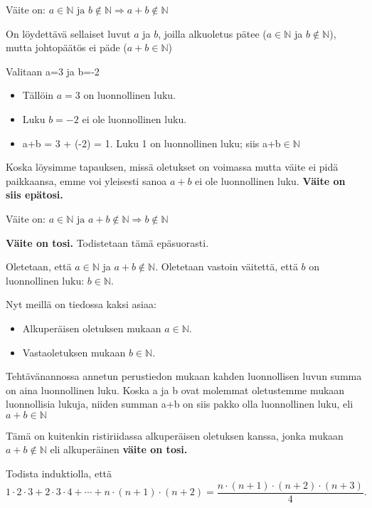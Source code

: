\documentclass[12pt,a4paper]{article}
\newcommand{\N}{\mathbb{N}}
\begin{document}
  \begin{alakohta}
  \item %
    Väite on: $a\in\N \textrm{ ja } b\notin\N \Rightarrow a+b\notin\N$

    On löydettävä sellaiset luvut $a$ ja $b$, joilla alkuoletus pätee
    ($a\in\N$ ja $b\notin\N$), mutta johtopäätös ei päde ($a+b\in\N$)

    Valitaan a=3 ja b=-2
    \begin{itemize}
      \item Tällöin $a=3$ on luonnollinen luku.
      \item Luku $b=-2$ ei ole luonnollinen luku.
      \item a+b = 3 + (-2) = 1. Luku 1 on luonnollinen luku; siis a+b$\in\N$
    \end{itemize}
    Koska löysimme tapauksen, missä oletukset on voimassa mutta väite
    ei pidä paikkaansa, emme voi yleisesti sanoa $a+b$ ei ole
    luonnollinen luku. \textbf{Väite on siis epätosi.} 

  \item %
    Väite on: $a\in\N \textrm{ ja } a+b\notin\N \Rightarrow b\notin\N$

    \textbf{Väite on tosi.} Todistetaan tämä epäsuorasti.

    Oletetaan, että $a\in\N$ ja $a+b\notin\N$. Oletetaan vastoin väitettä,
    että $b$ on luonnollinen luku: $b\in\N$.

    Nyt meillä on tiedossa kaksi asiaa:
    \begin{itemize}
      \item Alkuperäisen oletuksen mukaan $a\in\N$.
      \item Vastaoletuksen mukaan $b\in\N$.
    \end{itemize}
    Tehtävänannossa annetun perustiedon mukaan kahden luonnollisen luvun
    summa on aina luonnollinen luku. Koska a ja b ovat molemmat
    oletustemme mukaan luonnollisia lukuja, niiden summan a+b on siis
    pakko olla luonnollinen luku, eli $a+b\in\N$

    Tämä on kuitenkin ristiriidassa alkuperäisen oletuksen kanssa,
    jonka mukaan $a+b\notin\N$ eli alkuperäinen \textbf{väite on tosi.} 
\end{alakohta}






\pagebreak
{}
Todista induktiolla, että
\[
1\cdot 2 \cdot 3 + 2\cdot 3\cdot 4 + \cdots + n\cdot (n+1) \cdot (n+2) = \frac{n\cdot(n+1)\cdot(n+2)\cdot(n+3)}{4}.
\]
\end{document}
